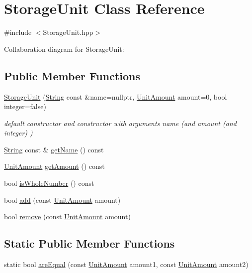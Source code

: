 \hypertarget{classStorageUnit}{}\section{Storage\+Unit Class Reference}
\label{classStorageUnit}


{\ttfamily \#include $<$Storage\+Unit.\+hpp$>$}



Collaboration diagram for Storage\+Unit\+:
\subsection*{Public Member Functions}
\begin{DoxyCompactItemize}
\item 
\hyperlink{classStorageUnit_aea07bc751e6ffc42161fb52724a3a1a4}{Storage\+Unit} (\hyperlink{classString}{String} const \&name=nullptr, \hyperlink{StorageUnit_8hpp_a13b2ba6b0400e1aa0b57282bd1228f20}{Unit\+Amount} amount=0, bool integer=false)
\begin{DoxyCompactList}\small\item\em default constructor and constructor with arguments name (and amount (and integer) ) \end{DoxyCompactList}\item 
\hyperlink{classString}{String} const  \& \hyperlink{classStorageUnit_acdc901c1def8c1937524d20d645e8738}{get\+Name} () const
\item 
\hyperlink{StorageUnit_8hpp_a13b2ba6b0400e1aa0b57282bd1228f20}{Unit\+Amount} \hyperlink{classStorageUnit_ae089fb2cb93956bfe209c0801a685252}{get\+Amount} () const
\item 
bool \hyperlink{classStorageUnit_a36c88992cc1346c082b9905a018ddace}{is\+Whole\+Number} () const
\item 
bool \hyperlink{classStorageUnit_aa454fd2b3fc333e7487327b77d9f9321}{add} (const \hyperlink{StorageUnit_8hpp_a13b2ba6b0400e1aa0b57282bd1228f20}{Unit\+Amount} amount)
\item 
bool \hyperlink{classStorageUnit_a790ca821c741cdf98d83d10ee68fe7e4}{remove} (const \hyperlink{StorageUnit_8hpp_a13b2ba6b0400e1aa0b57282bd1228f20}{Unit\+Amount} amount)
\end{DoxyCompactItemize}
\subsection*{Static Public Member Functions}
\begin{DoxyCompactItemize}
\item 
static bool \hyperlink{classStorageUnit_a21699592d4c02bdf864e06c615a7f0c7}{are\+Equal} (const \hyperlink{StorageUnit_8hpp_a13b2ba6b0400e1aa0b57282bd1228f20}{Unit\+Amount} amount1, const \hyperlink{StorageUnit_8hpp_a13b2ba6b0400e1aa0b57282bd1228f20}{Unit\+Amount} amount2)
\end{DoxyCompactItemize}
